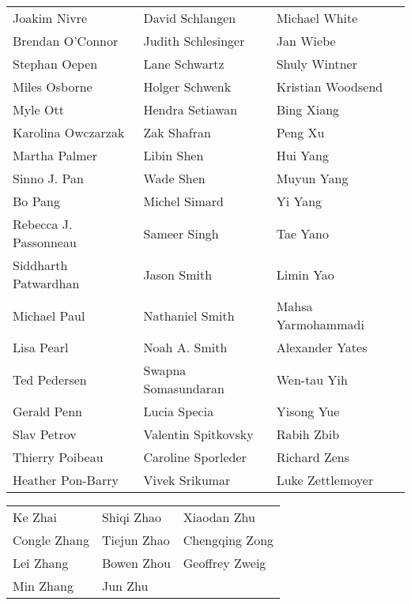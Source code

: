 \begin{tabular*}{\textwidth}{@{\extracolsep{\fill}} lll }
  Joakim Nivre  & David Schlangen  & Michael White \\
  Brendan O'Connor  & Judith Schlesinger  & Jan Wiebe \\
  Stephan Oepen  & Lane Schwartz  & Shuly Wintner \\
  Miles Osborne  & Holger Schwenk  & Kristian Woodsend \\
  Myle Ott  & Hendra Setiawan  & Bing Xiang \\
  Karolina Owczarzak  & Zak Shafran  & Peng Xu \\
  Martha Palmer  & Libin Shen  & Hui Yang \\
  Sinno J. Pan  & Wade Shen  & Muyun Yang \\
  Bo Pang  & Michel Simard  & Yi Yang \\
  Rebecca J. Passonneau  & Sameer Singh  & Tae Yano \\
  Siddharth Patwardhan  & Jason Smith  & Limin Yao \\
  Michael Paul  & Nathaniel Smith  & Mahsa Yarmohammadi \\
  Lisa Pearl  & Noah A. Smith  & Alexander Yates \\
  Ted Pedersen  & Swapna Somasundaran  & Wen-tau Yih \\
  Gerald Penn  & Lucia Specia  & Yisong Yue \\
  Slav Petrov  & Valentin Spitkovsky  & Rabih Zbib \\
  Thierry Poibeau  & Caroline Sporleder  & Richard Zens \\
  Heather Pon-Barry  & Vivek Srikumar  & Luke Zettlemoyer \\
\end{tabular*}

\begin{tabular*}{\textwidth}{@{\extracolsep{\fill}} lll }
  Ke Zhai  & Shiqi Zhao  & Xiaodan Zhu \\
  Congle Zhang  & Tiejun Zhao  & Chengqing Zong \\
  Lei Zhang  & Bowen Zhou  & Geoffrey Zweig \\
  Min Zhang  & Jun Zhu  &  \\
\end{tabular*}

